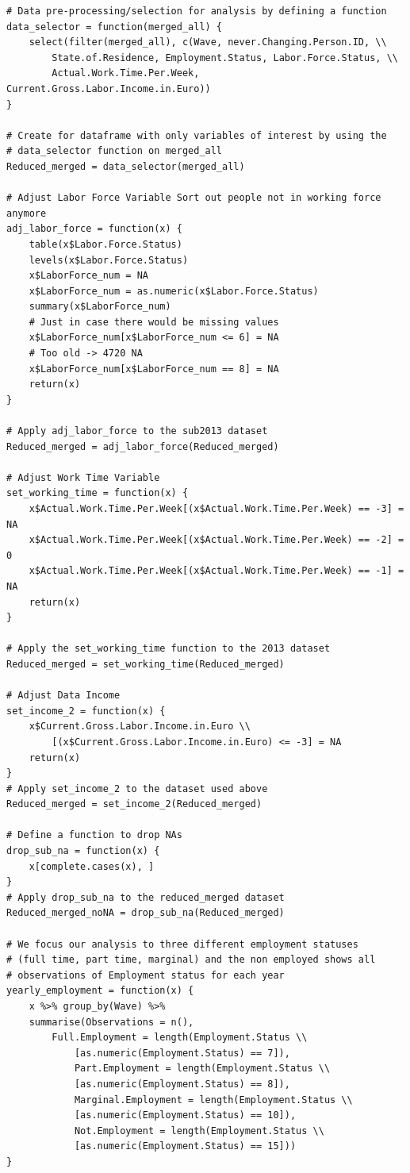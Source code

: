 \documentclass[a4paper]{article}
\begin{document}
{\begin{lstlisting}
# Data pre-processing/selection for analysis by defining a function
data_selector = function(merged_all) {
    select(filter(merged_all), c(Wave, never.Changing.Person.ID, \\ 
    	State.of.Residence, Employment.Status, Labor.Force.Status, \\ 
        Actual.Work.Time.Per.Week, Current.Gross.Labor.Income.in.Euro))
}

# Create for dataframe with only variables of interest by using the 
# data_selector function on merged_all
Reduced_merged = data_selector(merged_all)

# Adjust Labor Force Variable Sort out people not in working force anymore
adj_labor_force = function(x) {
    table(x$Labor.Force.Status)
    levels(x$Labor.Force.Status)
    x$LaborForce_num = NA
    x$LaborForce_num = as.numeric(x$Labor.Force.Status)
    summary(x$LaborForce_num)
    # Just in case there would be missing values
    x$LaborForce_num[x$LaborForce_num <= 6] = NA
    # Too old -> 4720 NA
    x$LaborForce_num[x$LaborForce_num == 8] = NA
    return(x)
}

# Apply adj_labor_force to the sub2013 dataset
Reduced_merged = adj_labor_force(Reduced_merged)

# Adjust Work Time Variable
set_working_time = function(x) {
    x$Actual.Work.Time.Per.Week[(x$Actual.Work.Time.Per.Week) == -3] = NA
    x$Actual.Work.Time.Per.Week[(x$Actual.Work.Time.Per.Week) == -2] = 0
    x$Actual.Work.Time.Per.Week[(x$Actual.Work.Time.Per.Week) == -1] = NA
    return(x)
}

# Apply the set_working_time function to the 2013 dataset
Reduced_merged = set_working_time(Reduced_merged)

# Adjust Data Income
set_income_2 = function(x) {
    x$Current.Gross.Labor.Income.in.Euro \\
    	[(x$Current.Gross.Labor.Income.in.Euro) <= -3] = NA
    return(x)
}
# Apply set_income_2 to the dataset used above
Reduced_merged = set_income_2(Reduced_merged)

# Define a function to drop NAs
drop_sub_na = function(x) {
    x[complete.cases(x), ]
}
# Apply drop_sub_na to the reduced_merged dataset
Reduced_merged_noNA = drop_sub_na(Reduced_merged)

# We focus our analysis to three different employment statuses 
# (full time, part time, marginal) and the non employed shows all 
# observations of Employment status for each year
yearly_employment = function(x) {
    x %>% group_by(Wave) %>% 
    summarise(Observations = n(), 
    	Full.Employment = length(Employment.Status \\ 
        	[as.numeric(Employment.Status) == 7]), 
            Part.Employment = length(Employment.Status \\ 
        	[as.numeric(Employment.Status) == 8]), 
            Marginal.Employment = length(Employment.Status \\ 
        	[as.numeric(Employment.Status) == 10]), 
            Not.Employment = length(Employment.Status \\ 
        	[as.numeric(Employment.Status) == 15]))
}


\end{lstlisting}}
\end{document}
